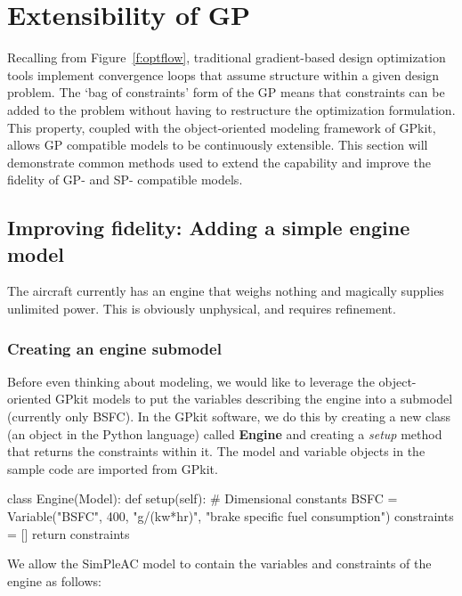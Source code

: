 \chapter{Extensibility of GP}
\label{ch3:extensibility}

Recalling from Figure~\ref{f:optflow}, traditional gradient-based design optimization tools implement
convergence loops that assume structure within a given design problem.
The `bag of constraints' form of the GP means that constraints can be
added to the problem without
having to restructure the optimization formulation. This property,
coupled with the object-oriented modeling framework of GPkit, allows
\gls{GP} compatible models to be continuously extensible.
This section will demonstrate common methods used to extend the capability
and improve the fidelity of \gls{GP}- and \gls{SP}- compatible models.

\section{Improving fidelity: Adding a simple engine model}
\label{s:engine}

The aircraft currently has an engine that weighs nothing and magically supplies
unlimited power. This is obviously unphysical, and requires refinement.

\subsection{Creating an engine submodel}

Before even thinking about modeling, we would like to leverage the object-oriented
GPkit models to put the variables describing the engine into a submodel (currently only
BSFC). In the GPkit software, we do this by creating a new class (an object in the Python language)
called \textbf{Engine} and creating a \textit{setup}
method that returns the constraints within it. The model and variable objects in the sample code
are imported from GPkit.

\begin{python}
    class Engine(Model):
        def setup(self):
            # Dimensional constants
            BSFC = Variable("BSFC", 400, "g/(kw*hr)",
                                    "brake specific fuel consumption")
            constraints = []
            return constraints
\end{python}

We allow the SimPleAC model to contain the variables and constraints of the engine
as follows:

